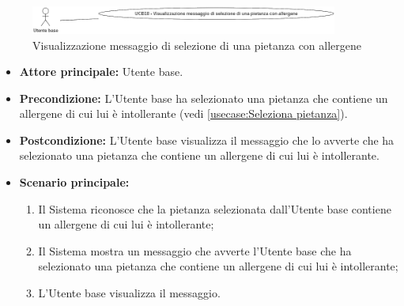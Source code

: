 \label{usecase:Visualizzazione messaggio di selezione di una pietanza con allergene}

\begin{figure}[h]
	\centering
	\includegraphics[width=0.9\textwidth]{./uml/UCB18.png} 
	\caption{Visualizzazione messaggio di selezione di una pietanza con allergene}
	\label{fig:UCB20}
  \end{figure}

\begin{itemize}
	\item \textbf{Attore principale:} Utente base.

	\item \textbf{Precondizione:}
	      L'Utente base ha selezionato una pietanza che contiene un allergene di cui lui è intollerante (vedi \autoref{usecase:Seleziona pietanza}).

	\item \textbf{Postcondizione:}
	      L'Utente base visualizza il messaggio che lo avverte che ha selezionato una pietanza che contiene un allergene di cui lui è intollerante.

	\item \textbf{Scenario principale:}
	      \begin{enumerate}
		      \item Il Sistema riconosce che la pietanza selezionata dall'Utente base contiene un allergene di cui lui è intollerante;
		      \item Il Sistema mostra un messaggio che avverte l'Utente base che ha selezionato una pietanza che contiene un allergene di cui lui è intollerante;
		      \item L'Utente base visualizza il messaggio.
	      \end{enumerate}
\end{itemize}
